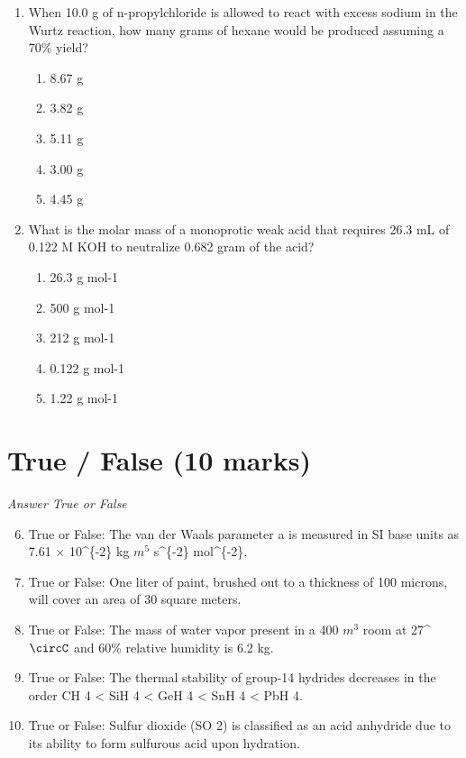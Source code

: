 \documentclass[12pt]{article}
\begin{document}
\begin{enumerate}[label=\arabic*.]
\begin{enumerate}[label=(\alph*)]
\end{enumerate}
\item When 10.0 g of n-propylchloride is allowed to react with excess sodium in the Wurtz reaction, how many grams of hexane would be produced assuming a 70\% yield?
\begin{enumerate}[label=(\alph*)]
    \item 8.67 g
    \item 3.82 g
    \item 5.11 g
    \item 3.00 g
    \item 4.45 g
\end{enumerate}
\item What is the molar mass of a monoprotic weak acid that requires 26.3 mL of 0.122 M KOH to neutralize 0.682 gram of the acid?
\begin{enumerate}[label=(\alph*)]
    \item 26.3 g mol-1
    \item 500 g mol-1
    \item 212 g mol-1
    \item 0.122 g mol-1
    \item 1.22 g mol-1
\end{enumerate}
\end{enumerate}

\section*{True / False (10 marks)}
\textit{Answer True or False}
\begin{enumerate}[label=\arabic*.]
\setcounter{enumi}{5}
\item True or False: The van der Waals parameter a is measured in SI base units as 7.61 \ensuremath{\times} 10^\{-2\} kg $m^5$ s^\{-2\} mol^\{-2\}.
\item True or False: One liter of paint, brushed out to a thickness of 100 microns, will cover an area of 30 square meters.
\item True or False: The mass of water vapor present in a 400 $m^3$ room at 27^\ensuremath{\circC} and 60\% relative humidity is 6.2 kg.
\item True or False: The thermal stability of group-14 hydrides decreases in the order CH 4 \textless{} SiH 4 \textless{} GeH 4 \textless{} SnH 4 \textless{} PbH 4.
\item True or False: Sulfur dioxide (SO 2) is classified as an acid anhydride due to its ability to form sulfurous acid upon hydration.
\end{enumerate}
\end{document}
